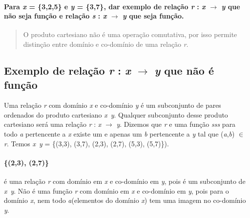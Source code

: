 
\paragraph{Para \textit{x} = \{3,2,5\} e \textit{y} = \{3,7\}, dar exemplo de relação \textit{r} : \textit{x} $\rightarrow$ \textit{y} que não seja função e relação  \textit{s} : \textit{x} $\rightarrow$ \textit{y} que seja função.}

\begin{quote}
	
	O produto cartesiano não é uma operação comutativa, por isso permite distinção entre domínio e co-domínio de uma relação \textit{r}.
\end{quote}


\subsection{Exemplo de relação \textit{r} : \textit{x} $\rightarrow$ \textit{y} que não é função}
	Uma relação \textit{r} com domínio \textit{x} e co-domínio \textit{y} é um subconjunto de pares ordenados do produto cartesiano \textit{x} \texttimes \,\textit{y}. Qualquer subconjunto desse produto cartesiano será uma relação \textit{r} : \textit{x} $\rightarrow$ \textit{y}.\newline
	Dizemos que \textit{r} e uma função \textit{sss} para todo \textit{a} pertencente a \textit{x} existe um e apenas um \textit{b} pertencente a \textit{y} tal que (\textit{a},\textit{b}) $\in$ \textit{r}. Temos \textit{x} \texttimes \,\textit{y} = \{(3,3), (3,7), (2,3), (2,7), (5,3), (5,7)\}).
	\paragraph{\{(2,3), (2,7)\}} é uma relação \textit{r} com domínio em \textit{x} e co-domínio em \textit{y}, pois é um subconjunto de \textit{x} \texttimes \,\textit{y}. Não é uma função \textit{r} com domínio em \textit{x} e co-domínio em \textit{y}, pois para o domínio \textit{x}, nem todo \textit{a}(elementos do domínio \textit{x}) tem uma imagem no co-domínio \textit{y}. 
	 

